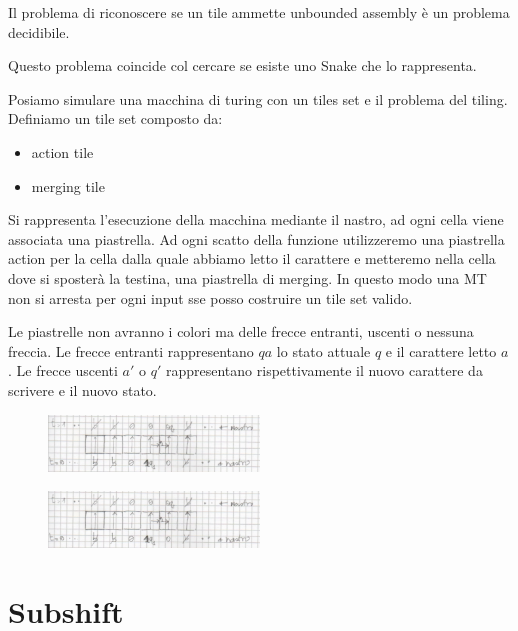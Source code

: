 \begin{teorema}
    Il problema di riconoscere se un tile ammette unbounded assembly è un problema decidibile.

    Questo problema coincide col cercare se esiste uno Snake che lo rappresenta.
\end{teorema}

Posiamo simulare una macchina di turing con un tiles set e il problema del tiling.
Definiamo un tile set composto da:
\begin{itemize}
    \item action tile
    \item merging tile
\end{itemize}
Si rappresenta l'esecuzione della macchina mediante il nastro, ad ogni cella viene
associata una piastrella. Ad ogni scatto della funzione utilizzeremo
una piastrella action per la cella dalla quale abbiamo letto il carattere e metteremo
nella cella dove si sposterà la testina, una piastrella di merging. In questo modo
una MT non si arresta per ogni input sse posso costruire un tile set valido.

\begin{nota}
    Le piastrelle non avranno i colori ma delle frecce entranti, uscenti o nessuna
    freccia. Le frecce entranti rappresentano $qa$ lo stato attuale $q$ e il carattere
    letto $a$. Le frecce uscenti $a'$ o $q'$ rappresentano rispettivamente il nuovo
    carattere da scrivere e il nuovo stato.
\end{nota}

\begin{figure}[!h]
    \centering
    \includegraphics[width=0.5\textwidth]{img/sistemi_complessi/simulazione_mt_tile.png}
\end{figure}
\begin{figure}[!h]
    \centering
    \includegraphics[width=0.5\textwidth]{img/sistemi_complessi/simulazione_mt_tile.png}
\end{figure}
\section{Subshift}

